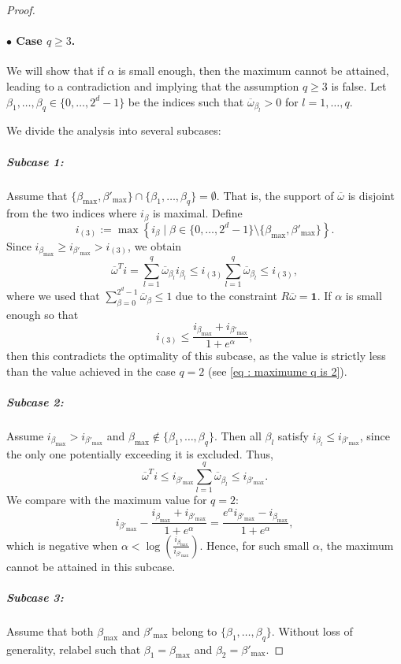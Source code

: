 \documentclass[a4paper, 11pt]{article}
\theoremstyle{definition}
\begin{document}
{\begin{proof}
\paragraph{$\bullet$ Case $q \ge 3$.}
We will show that if $\alpha$ is small enough, then the maximum cannot be attained, leading to a contradiction and implying that the assumption $q \ge 3$ is false.
Let $\beta_{1}, \dots, \beta_{q} \in \{0,\dots,2^d-1\}$ be the indices such that $\overline{\omega}_{\beta_{l}} > 0$ for $l = 1,\dots,q$.

We divide the analysis into several subcases:

\subparagraph{Subcase 1:} Assume that $\{\beta_{\max}, \beta'_{\max}\} \cap \{\beta_{1},\dots,\beta_{q}\} = \emptyset$.  
That is, the support of $\overline{\omega}$ is disjoint from the two indices where $i_\beta$ is maximal. Define
\[
i_{(3)} := \max\left\{ i_{\beta} \mid \beta \in \{0,\dots,2^d-1\} \setminus \{\beta_{\max}, \beta'_{\max} \} \right\}.
\]
Since $i_{\beta_{\max}} \ge i_{\beta'_{\max}} > i_{(3)}$, we obtain
\[
\overline{\omega}^T i = \sum_{l=1}^q \overline{\omega}_{\beta_l} i_{\beta_l} \le i_{(3)} \sum_{l=1}^q \overline{\omega}_{\beta_l} \le i_{(3)},
\]
where we used that $\sum_{\beta=0}^{2^d-1} \overline{\omega}_\beta \le 1$ due to the constraint $R\overline{\omega} = \bm{1}$.  
If $\alpha$ is small enough so that
\[
i_{(3)} \le \frac{i_{\beta_{\max}} + i_{\beta'_{\max}}}{1 + e^\alpha},
\]
then this contradicts the optimality of this subcase, as the value is strictly less than the value achieved in the case $q = 2$ (see \eqref{eq : maximume q is 2}).

\subparagraph{Subcase 2:} Assume $i_{\beta_{\max}} > i_{\beta'_{\max}}$ and $\beta_{\max} \notin \{\beta_1, \dots, \beta_q\}$.  
Then all $\beta_l$ satisfy $i_{\beta_l} \le i_{\beta'_{\max}}$, since the only one potentially exceeding it is excluded. Thus,
\[
\overline{\omega}^T i \le i_{\beta'_{\max}} \sum_{l=1}^q \overline{\omega}_{\beta_l} \le i_{\beta'_{\max}}.
\]
We compare with the maximum value for $q = 2$:
\[
i_{\beta'_{\max}} - \frac{i_{\beta_{\max}} + i_{\beta'_{\max}}}{1 + e^\alpha} 
= \frac{e^\alpha i_{\beta'_{\max}} - i_{\beta_{\max}}}{1 + e^\alpha},
\]
which is negative when $\alpha < \log\left( \frac{i_{\beta_{\max}}}{i_{\beta'_{\max}}} \right)$.  
Hence, for such small $\alpha$, the maximum cannot be attained in this subcase.

\subparagraph{Subcase 3:} Assume that both $\beta_{\max}$ and $\beta'_{\max}$ belong to $\{\beta_1, \dots, \beta_q\}$.  
Without loss of generality, relabel such that $\beta_1 = \beta_{\max}$ and $\beta_2 = \beta'_{\max}$.  


\end{proof}}
\end{document}

